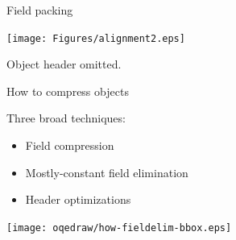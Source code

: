 \documentclass[%
pdf,
colorBG,
slideColor,
nototal,
oqe
]{prosper}
\begin{document}


\begin{slide}{Field packing}
\begin{center}
\vspace{0.75cm}
\texttt{[image: Figures/alignment2.eps]}

\small Object header omitted.
\end{center}
\end{slide}

\begin{slide}{How to compress objects} %

Three broad techniques:

\parbox[b]{2.5in}{%
\begin{itemize}%
\lightgray\renewcommand{\green}{\lightgray}%
\item Field compression
\fieldelim\renewcommand{\green}{\fieldelim}%
\item Mostly-constant field elimination
\lightgray\renewcommand{\green}{\lightgray}%
\item Header optimizations
\renewcommand{\green}{\yellow} %
\end{itemize}
}%
\parbox[b]{1.75in}{%
\hspace*{0.106in}\texttt{[image: oqedraw/how-fieldelim-bbox.eps]}%
}%
\end{slide}
\end{document}
